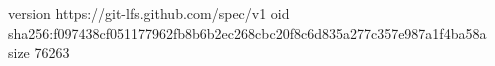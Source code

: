 version https://git-lfs.github.com/spec/v1
oid sha256:f097438cf051177962fb8b6b2ec268cbc20f8c6d835a277c357e987a1f4ba58a
size 76263
